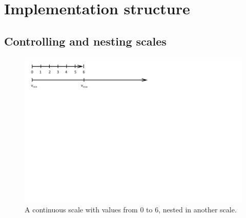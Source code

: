 \documentclass{jfp}
\begin{document}
\section{Implementation structure}
\label{sec:impl}

\newpage


\subsection*{Controlling and nesting scales}

\begin{figure}[!h]
\includegraphics[scale=1,trim={0cm 7.5cm 6cm 0cm},clip]{nest.pdf}
\caption{A continuous scale with values from $0$ to $6$, nested in another scale.}
\label{fig:nesting}
\end{figure}
\end{document}
